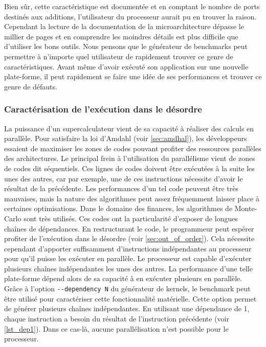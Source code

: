     Bien sûr, cette caractéristique est documentée et en comptant le nombre de ports destinés aux additions, l'utilisateur du processeur aurait pu en trouver la raison. Cependant la lecture de la documentation de la microarchitecture dépasse le millier de pages et en comprendre les moindres détails est plus difficile que d'utiliser les bons outils. Nous pensons que le générateur de benchmarks peut permettre à n'importe quel utilisateur de rapidement trouver ce genre de caractéristiques. Avant même d'avoir exécuté son application sur une nouvelle plate-forme, il peut rapidement se faire une idée de ses performances et trouver ce genre de défauts.




    \subsubsection{Caractérisation de l'exécution dans le désordre}\label{sec:kg_out_of_order_dependency}

    La puissance d'un supercalculateur vient de sa capacité à réaliser des calculs en parallèle. Pour satisfaire la loi d'Amdahl (voir \autoref{sec:amdhal}), les développeurs essaient de maximiser les zones de codes pouvant profiter des ressources parallèles des architectures. Le principal frein à l'utilisation du parallélisme vient de zones de codes dit séquentiels. Ces lignes de codes doivent être exécutées à la suite les unes des autres, car par exemple, une de ces instructions nécessite d'avoir le résultat de la précédente. Les performances d'un tel code peuvent être très mauvaises, mais la nature des algorithmes peut assez fréquemment laisser place à certaines optimisations. Dans le domaine des finances, les algorithmes de Monte-Carlo sont très utilisés. Ces codes ont la particularité d'exposer de longues chaînes de dépendances. En restructurant le code, le programmeur peut espérer profiter de l'exécution dans le désordre (voir \autoref{sec:out_of_order}). Cela nécessite cependant d'apporter suffisamment d'instructions indépendantes au processeur pour qu'il puisse les exécuter en parallèle. Le processeur est capable d'exécuter plusieurs chaînes indépendantes les unes des autres. La performance d'une telle plate-forme dépend alors de sa capacité à en exécuter plusieurs en parallèle. Grâce à l'option \verb|--dependency N| du générateur de kernels, le benchmark peut être utilisé pour caractériser cette fonctionnalité matérielle. Cette option permet de générer plusieurs chaînes indépendantes. En utilisant une dépendance de 1, chaque instruction a besoin du résultat de l'instruction précédente (voir \autoref{lst_dep1}). Dans ce cas-là, aucune parallélisation n'est possible pour le processeur.
    

